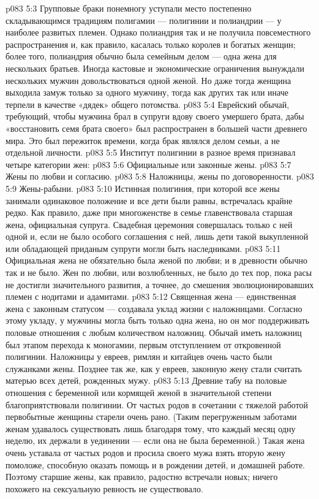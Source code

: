 \vs p083 5:3 Групповые браки понемногу уступали место постепенно складывающимся традициям полигамии --- полигинии и полиандрии --- у наиболее развитых племен. Однако полиандрия так и не получила повсеместного распространения и, как правило, касалась только королев и богатых женщин; более того, полиандрия обычно была семейным делом --- одна жена для нескольких братьев. Иногда кастовые и экономические ограничения вынуждали нескольких мужчин довольствоваться одной женой. Но даже тогда женщина выходила замуж только за одного мужчину, тогда как других так или иначе терпели в качестве «дядек» общего потомства.
\vs p083 5:4 Еврейский обычай, требующий, чтобы мужчина брал в супруги вдову своего умершего брата, дабы «восстановить семя брата своего» был распространен в большей части древнего мира. Это был пережиток времени, когда брак являлся делом семьи, а не отдельной личности.
\vs p083 5:5 Институт полигинии в разное время признавал четыре категории жен:
\vs p083 5:6 \bibnobreakspace Официальные или законные жены.
\vs p083 5:7 \bibnobreakspace Жены по любви и согласию.
\vs p083 5:8 \bibnobreakspace Наложницы, жены по договоренности.
\vs p083 5:9 \bibnobreakspace Жены\hyp{}рабыни.
\vs p083 5:10 \pc Истинная полигиния, при которой все жены занимали одинаковое положение и все дети были равны, встречалась крайне редко. Как правило, даже при многоженстве в семье главенствовала старшая жена, официальная супруга. Свадебная церемония совершалась только с ней одной и, если не было особого соглашения с ней, лишь дети такой выкупленной или обладающей приданым супруги могли быть наследниками.
\vs p083 5:11 Официальная жена не обязательно была женой по любви; и в древности обычно так и не было. Жен по любви, или возлюбленных, не было до тех пор, пока расы не достигли значительного развития, а точнее, до смешения эволюционировавших племен с нодитами и адамитами.
\vs p083 5:12 Священная жена --- единственная жена с законным статусом --- создавала уклад жизни с наложницами. Согласно этому укладу, у мужчины могла быть только одна жена, но он мог поддерживать половые отношения с любым количеством наложниц. Обычай иметь наложниц был этапом перехода к моногамии, первым отступлением от откровенной полигинии. Наложницы у евреев, римлян и китайцев очень часто были служанками жены. Позднее так же, как у евреев, законную жену стали считать матерью всех детей, рожденных мужу.
\vs p083 5:13 Древние табу на половые отношения с беременной или кормящей женой в значительной степени благоприятствовали полигинии. От частых родов в сочетании с тяжелой работой первобытные женщины старели очень рано. (Таким перегруженным заботами женам удавалось существовать лишь благодаря тому, что каждый месяц одну неделю, их держали в уединении --- если она не была беременной.) Такая жена очень уставала от частых родов и просила своего мужа взять вторую жену помоложе, способную оказать помощь и в рождении детей, и домашней работе. Поэтому старшие жены, как правило, радостно встречали новых; ничего похожего на сексуальную ревность не существовало.
